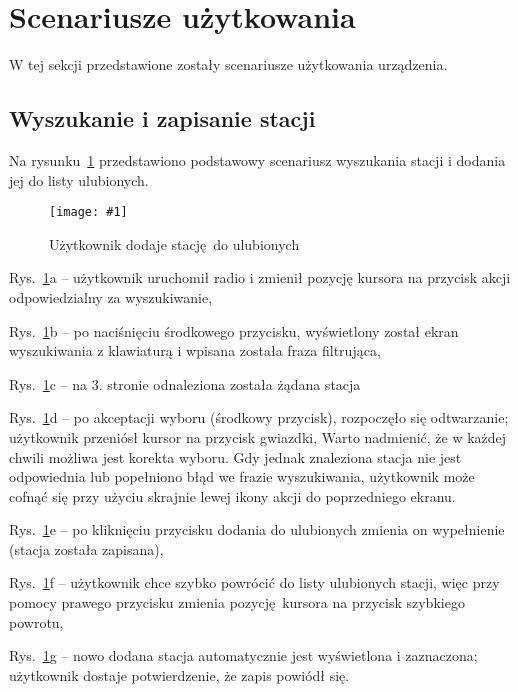 \documentclass[polish]{aghengthesis}
\let\tempone\itemize
\let\temptwo\enditemize
\renewenvironment{itemize}{\tempone\setlength{\itemsep}{0cm}}{\temptwo}
\newcommand{\imgint}[4]{
	\begin{figure}[{#4}]
		\centering
		\texttt{[image: \#1]}
		\caption{#2}
		\label{#1}
	\end{figure}
}
\newcommand{\imgh}[3]{\imgint{#1}{#2}{#3}{H}}
\begin{document}
	\section{Scenariusze użytkowania}
		W tej sekcji przedstawione zostały scenariusze użytkowania urządzenia.
	
		\subsection{Wyszukanie i zapisanie stacji}
			\newcommand{\rfladd}[1]{\ref{5/PicoRadio-fl-add}#1}
			
			Na rysunku~\rfladd{} przedstawiono podstawowy scenariusz wyszukania stacji i dodania jej do listy ulubionych.
			
			\imgh{5/PicoRadio-fl-add}{Użytkownik dodaje stację do ulubionych}{0.9}
			
			\begin{itemize}
				\item Rys.~\rfladd{a} -- użytkownik uruchomił radio i zmienił pozycję kursora na przycisk akcji odpowiedzialny za wyszukiwanie,
				\item Rys.~\rfladd{b} -- po naciśnięciu środkowego przycisku, wyświetlony został ekran wyszukiwania z klawiaturą i wpisana została fraza filtrująca,
				\item Rys.~\rfladd{c} -- na 3. stronie odnaleziona została żądana stacja
				\item Rys.~\rfladd{d} -- po akceptacji wyboru (środkowy przycisk), rozpoczęło się odtwarzanie; użytkownik przeniósł kursor na przycisk gwiazdki,
			\end{itemize}
			Warto nadmienić, że w każdej chwili możliwa jest korekta wyboru. Gdy jednak znaleziona stacja nie jest odpowiednia lub popełniono błąd we frazie wyszukiwania, użytkownik może cofnąć się przy użyciu skrajnie lewej ikony akcji do poprzedniego ekranu.
			\begin{itemize}
				\item Rys.~\rfladd{e} -- po kliknięciu przycisku dodania do ulubionych zmienia on wypełnienie (stacja została zapisana),
				\item Rys.~\rfladd{f} -- użytkownik chce szybko powrócić do listy ulubionych stacji, więc przy pomocy prawego przycisku zmienia pozycję kursora na przycisk szybkiego powrotu,
				\item Rys.~\rfladd{g} -- nowo dodana stacja automatycznie jest wyświetlona i zaznaczona; użytkownik dostaje potwierdzenie, że zapis powiódł się.
			\end{itemize}
			
\end{document}
